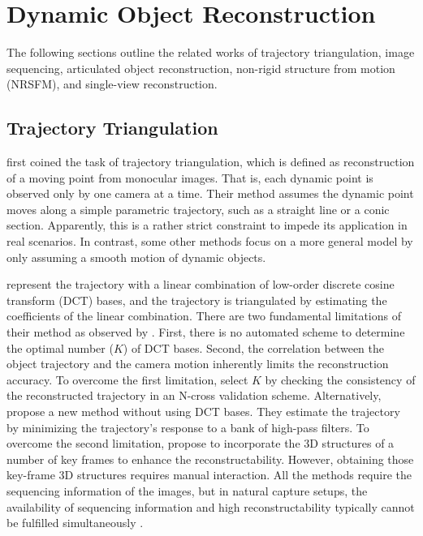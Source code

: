 \section{Dynamic Object Reconstruction}
The following sections outline the related works of trajectory triangulation, image sequencing, articulated object reconstruction,  non-rigid structure from motion (NRSFM), and single-view reconstruction.

\subsection{Trajectory Triangulation}
\citet{avidan2000trajectory} first coined the task of trajectory triangulation, which is defined as  reconstruction of a moving point from monocular images. That is, each dynamic point is observed only by one camera at a time. Their method assumes the dynamic point moves along a simple parametric trajectory, such as a straight line or a conic section. Apparently, this is a rather strict constraint to impede its application in real scenarios. 
In contrast, some other methods  \cite{Park_ECCV2010,Valmadre_CVPR2012,ZhuCL_CVPR11,park20153d} focus on a more general model by only assuming a smooth motion of dynamic objects.

\citet{Park_ECCV2010} represent the trajectory with a linear combination of low-order discrete cosine transform (DCT) bases, and the trajectory is triangulated by estimating the coefficients of the linear combination. There are two fundamental limitations of their method as observed by \citet{Valmadre_CVPR2012}. First, there is no automated scheme to determine the optimal number ($K$) of DCT bases. Second, the correlation between the object trajectory and the camera motion inherently limits the reconstruction accuracy. To overcome the first limitation, \citet{park20153d} select $K$ by checking the consistency of the reconstructed trajectory in an N-cross validation scheme.
Alternatively, \citet{Valmadre_CVPR2012} propose a new method without using DCT bases. They estimate the trajectory by minimizing the trajectory's response to a bank of high-pass filters. To overcome the second limitation, \citet{ZhuCL_CVPR11} propose to incorporate the 3D structures of a number of key frames to enhance the reconstructability. However, obtaining those key-frame 3D structures requires manual interaction. All the methods \cite{Park_ECCV2010,Valmadre_CVPR2012,ZhuCL_CVPR11} require the sequencing information of the images, but in natural capture setups, the availability of sequencing information and high reconstructability typically cannot be fulfilled simultaneously \cite{ZhuCL_CVPR11,park20153d}. 

